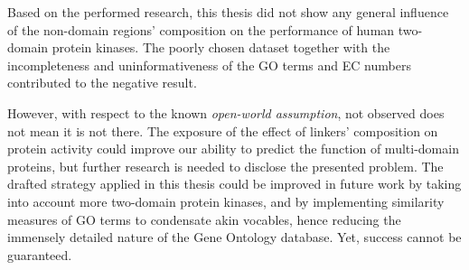 \label{conclusion}

Based on the performed research, this thesis did not show any general influence of the
non-domain regions' composition on the performance of human two-domain protein kinases.
The poorly chosen dataset together with the incompleteness and uninformativeness of the
GO terms and EC numbers contributed to the negative result.

However, with respect to the known \emph{open-world assumption}, not observed does not
mean it is not there.
The exposure of the effect of linkers' composition on protein activity could improve our
ability to predict the function of multi-domain proteins, but further research is needed
to disclose the presented problem.
The drafted strategy applied in this thesis could be improved in future work by taking
into account more two-domain protein kinases, and by implementing similarity measures of
GO terms to condensate akin vocables, hence reducing the immensely detailed nature of the
Gene Ontology database.
Yet, success cannot be guaranteed.
